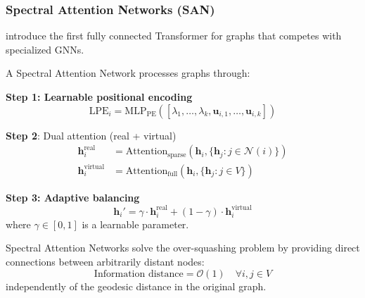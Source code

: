 \subsubsection{Spectral Attention Networks (SAN)}\label{subsubsec:spectral_attention_networks}

\citet{kreuzer2021spectral} introduce the first fully connected Transformer for graphs that competes with specialized GNNs.

\begin{definition}\label{def:san_architecture}
A Spectral Attention Network processes graphs through:

\textbf{Step 1: Learnable positional encoding}
\begin{equation}
    \text{LPE}_i = \text{MLP}_{\text{PE}}([\lambda_1, \ldots, \lambda_k, \mathbf{u}_{i,1}, \ldots, \mathbf{u}_{i,k}])
    \label{eq:learned_positional_encoding}
\end{equation}

\textbf{Step 2}: Dual attention (real + virtual)
\begin{align}
    \mathbf{h}_i^{\text{real}} &= \text{Attention}_{\text{sparse}}(\mathbf{h}_i, \{\mathbf{h}_j : j \in \mathcal{N}(i)\}) \\
    \mathbf{h}_i^{\text{virtual}} &= \text{Attention}_{\text{full}}(\mathbf{h}_i, \{\mathbf{h}_j : j \in V\})
    \label{eq:dual_attention_san}
\end{align}

\textbf{Step 3: Adaptive balancing}
\begin{equation}
    \mathbf{h}_i' = \gamma \cdot \mathbf{h}_i^{\text{real}} + (1-\gamma) \cdot \mathbf{h}_i^{\text{virtual}}
    \label{eq:adaptive_balancing_san}
\end{equation}
where $\gamma \in [0,1]$ is a learnable parameter.
\end{definition}

\begin{theorem}\label{thm:over_squashing_resolution}
Spectral Attention Networks solve the over-squashing problem by providing direct connections between arbitrarily distant nodes:
\begin{equation}
    \text{Information distance} = \mathcal{O}(1) \quad \forall i,j \in V
    \label{eq:information_distance_constant}
\end{equation}
independently of the geodesic distance in the original graph.
\end{theorem}

